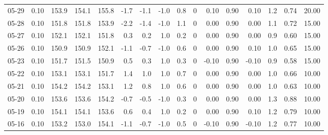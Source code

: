 \begin{threeparttable}
{\begin{tabular}{lrrrrrrrrrrrrrrr}
  05-29 &     0.10 & 153.9 & 154.1 & 155.8 &       -1.7 &           -1.1 &                     -1.0 &                 0.8 &              0 &       0.10 &      0.90 &           0.10 &              1.2 &            0.74 &                  20.00 \\
  05-28 &     0.10 & 151.8 & 151.8 & 153.9 &       -2.2 &           -1.4 &                     -1.0 &                 1.1 &              0 &       0.00 &      0.90 &           0.00 &              1.1 &            0.72 &                  15.00 \\
  05-27 &     0.10 & 152.1 & 152.1 & 151.8 &        0.3 &            0.2 &                      1.0 &                 0.2 &              0 &       0.00 &      0.90 &           0.00 &              0.9 &            0.60 &                  15.00 \\
  05-26 &     0.10 & 150.9 & 150.9 & 152.1 &       -1.1 &           -0.7 &                     -1.0 &                 0.6 &              0 &       0.00 &      0.90 &           0.10 &              1.0 &            0.65 &                  15.00 \\
  05-23 &     0.10 & 151.7 & 151.5 & 150.9 &        0.5 &            0.3 &                      1.0 &                 0.3 &              0 &      -0.10 &      0.90 &          -0.10 &              0.9 &            0.58 &                  15.00 \\
  05-22 &     0.10 & 153.1 & 153.1 & 151.7 &        1.4 &            1.0 &                      1.0 &                 0.7 &              0 &       0.00 &      0.90 &           0.00 &              1.0 &            0.66 &                  10.00 \\
  05-21 &     0.10 & 154.2 & 154.2 & 153.1 &        1.2 &            0.8 &                      1.0 &                 0.6 &              0 &       0.00 &      0.90 &           0.00 &              1.0 &            0.63 &                  10.00 \\
  05-20 &     0.10 & 153.6 & 153.6 & 154.2 &       -0.7 &           -0.5 &                     -1.0 &                 0.3 &              0 &       0.00 &      0.90 &           0.00 &              1.3 &            0.88 &                  10.00 \\
  05-19 &     0.10 & 154.1 & 154.1 & 153.6 &        0.6 &            0.4 &                      1.0 &                 0.2 &              0 &       0.00 &      0.90 &           0.10 &              1.2 &            0.79 &                  10.00 \\
  05-16 &     0.10 & 153.2 & 153.0 & 154.1 &       -1.1 &           -0.7 &                     -1.0 &                 0.5 &              0 &      -0.10 &      0.90 &          -0.10 &              1.2 &            0.77 &                  10.00 \\

\end{tabular}}
\end{threeparttable}
